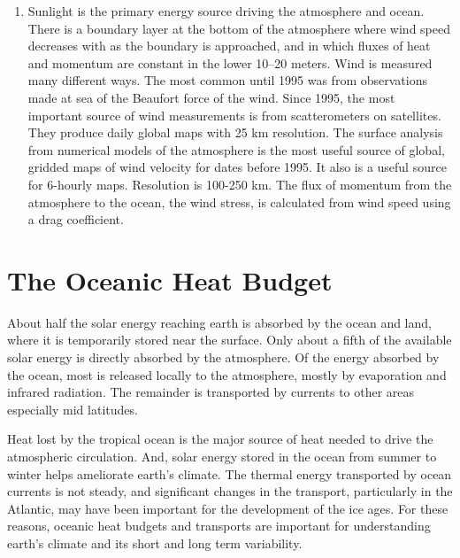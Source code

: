\begin{enumerate}
\item
Sunlight is the primary energy source driving the atmosphere and ocean.
\vitem
There is a boundary layer at the bottom of the atmosphere where wind speed
decreases with as the boundary is approached, and in which fluxes of heat and momentum are
constant in the lower 10--20 meters.
\vitem
Wind is measured many different ways. The most common until 1995 was from observations
made at sea of the Beaufort force of the wind.
\vitem
Since 1995, the most important source of wind measurements is from
scatterometers on satellites. They
produce daily global maps with 25 km resolution. 
\vitem
The surface analysis from numerical models of the atmosphere is
the most useful source of global, gridded maps of wind velocity for dates before 1995. It
also is a useful source for 6-hourly maps. Resolution is 100-250 km.
\vitem
The flux of momentum from the atmosphere to the ocean, the wind stress, is
calculated from wind speed using a drag coefficient.
\end{enumerate}


\chapter{The Oceanic Heat Budget}

About half the solar energy reaching earth is absorbed by the ocean and land, where it is temporarily stored near the surface. Only about a fifth of the available solar energy is directly absorbed by the atmosphere. Of the energy absorbed by the ocean, most is released locally to the atmosphere, mostly by evaporation and infrared radiation. The remainder is transported by currents to other areas especially mid latitudes. 

Heat lost by the tropical ocean is the major source of heat needed to drive the atmospheric circulation.
And, solar energy stored in the ocean from summer to winter helps ameliorate earth's climate. The thermal energy transported by ocean currents is not steady, and significant changes in the transport, particularly in the Atlantic, may have been important for the development of the ice ages. For these reasons, oceanic heat budgets and transports are important for understanding earth's climate and its short and long term variability.

